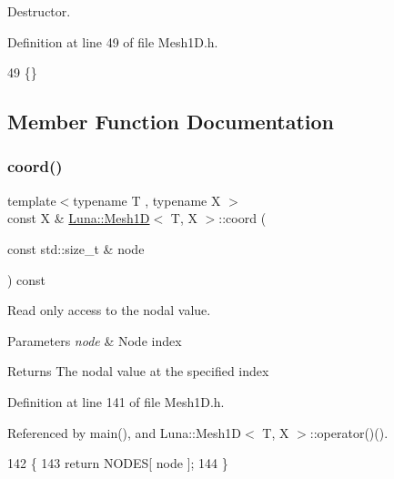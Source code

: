 Destructor. 



Definition at line 49 of file Mesh1\+D.\+h.


\begin{DoxyCode}
49 \{\}
\end{DoxyCode}


\subsection{Member Function Documentation}
\mbox{\label{classLuna_1_1Mesh1D_a116e935585276efbffe2a378058c12e4}} 
\subsubsection{\texorpdfstring{coord()}{coord()}\hspace{0.1cm}{\footnotesize\ttfamily [1/2]}}
{\footnotesize\ttfamily template$<$typename T , typename X $>$ \\
const X \& \hyperlink{classLuna_1_1Mesh1D}{Luna\+::\+Mesh1D}$<$ T, X $>$\+::coord (\begin{DoxyParamCaption}\item[{const std\+::size\+\_\+t \&}]{node }\end{DoxyParamCaption}) const\hspace{0.3cm}{\ttfamily [inline]}}



Read only access to the nodal value. 


\begin{DoxyParams}{Parameters}
{\em node} & Node index \\
\hline
\end{DoxyParams}
\begin{DoxyReturn}{Returns}
The nodal value at the specified index 
\end{DoxyReturn}


Definition at line 141 of file Mesh1\+D.\+h.



Referenced by main(), and Luna\+::\+Mesh1\+D$<$ T, X $>$\+::operator()().


\begin{DoxyCode}
142   \{
143     \textcolor{keywordflow}{return} NODES[ node ];
144   \}
\end{DoxyCode}
\mbox{\label{classLuna_1_1Mesh1D_a3cf086a7bc3f7846ee8cf57b935ae116}} 
